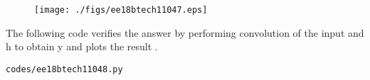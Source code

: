 \begin{enumerate}[label=\thesubsection.\arabic*.,ref=\thesubsection.\theenumi]
\begin{figure}[!ht]
\centering
  \texttt{[image: ./figs/ee18btech11047.eps]}
  \caption{}
  \label{fig:ee18btech11048}
\end{figure}


The following code verifies the answer by performing convolution of the input and h to obtain y and plots the result .
\begin{lstlisting}
codes/ee18btech11048.py
\end{lstlisting}

\end{enumerate}
